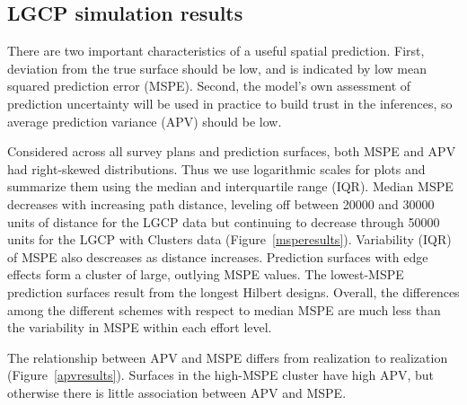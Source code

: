 \documentclass[review]{elsarticle}
\begin{document}
\subsection{LGCP simulation results}

There are two important characteristics of a useful spatial prediction. First,
deviation from the true surface should be low, and is indicated by low
mean squared prediction error (MSPE). Second, the model's own assessment of
prediction uncertainty will be used in practice to build trust in the
inferences, so average prediction variance (APV) should be low.

Considered across all survey plans and prediction surfaces, both MSPE and APV
had right-skewed distributions. Thus we use logarithmic scales for plots and
summarize them using the median and interquartile range (IQR). Median MSPE
decreases with increasing path distance, leveling off between 20000 and 30000
units of distance for the LGCP data but continuing to decrease through 50000
units for the LGCP with Clusters data (Figure~\ref{msperesults}). Variability
(IQR) of MSPE also descreases as distance increases. Prediction surfaces with
edge effects form a cluster of large, outlying MSPE values. The lowest-MSPE
prediction surfaces result from the longest Hilbert designs. Overall, the
differences among the different schemes with respect to median MSPE are much
less than the variability in MSPE within each effort level.

The relationship between APV and MSPE differs from realization to realization
(Figure~\ref{apvresults}). Surfaces in the high-MSPE cluster have high APV, but
otherwise there is little association between APV and MSPE.


\end{document}
